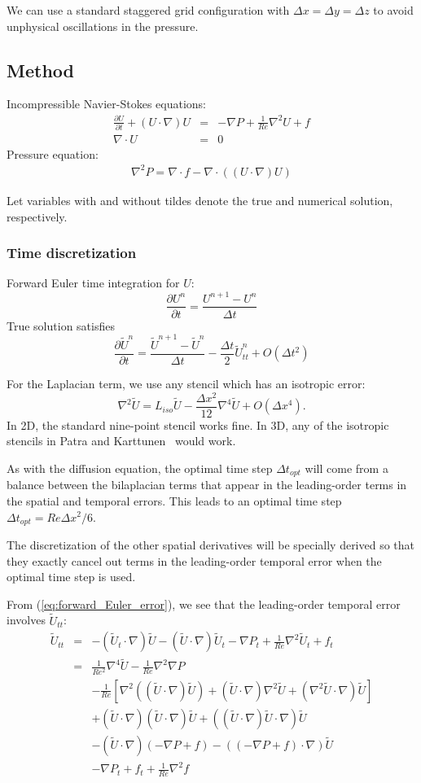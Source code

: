 \documentclass[fleqn,12pt,twoside]{article}
\newcommand{\beq}{\begin{equation}}
\newcommand{\eeq}{\end{equation}}
\newcommand{\bea}{\begin{eqnarray}}
\newcommand{\eea}{\end{eqnarray}}
\def\div{\ensuremath{\nabla \cdot}}
\def\grad{\ensuremath{\nabla}}
\def\lapl{\ensuremath{\nabla^2}}
\def\bilapl{\ensuremath{\nabla^4}}
\def\pt{\partial t}
\def\tU{\tilde{U}}
\def\dt{\Delta t}
\def\dx{\Delta x}
\def\dy{\Delta y}
\def\dz{\Delta z}
\begin{document}
We can use a standard staggered grid configuration with $\dx = \dy = \dz $ 
to avoid unphysical oscillations in the pressure.


\subsection{Method}
Incompressible Navier-Stokes equations:
\bea
  \frac{\partial U}{\pt} + \left(U \cdot \grad \right) U 
    &=& -\grad P + \frac{1}{Re} \lapl U + f
    \\
  \div U &=& 0
\eea
Pressure equation:
\bea
  \lapl P = \div f - \div \left( (U \cdot \grad) U \right)
\eea

Let variables with and without tildes denote the true and numerical solution,
respectively.


\subsubsection{Time discretization}
Forward Euler time integration for $U$:
\beq
  \frac{\partial U^n}{\pt} = \frac{U^{n+1}-U^{n}}{\dt} 
\eeq
True solution satisfies
\beq
  \frac{\partial \tU^n}{\pt} = 
    \frac{\tU^{n+1}-\tU^{n}}{\dt} - \frac{\dt}{2} \tU^n_{tt} + O(\dt^2)
  \label{eq:forward_Euler_error}
\eeq

For the Laplacian term, we use any stencil which has an isotropic error:
\beq
  \lapl \tU = L_{iso} \tU - \frac{\dx^2}{12} \bilapl \tU + O(\dx^4).
\eeq
In 2D, the standard nine-point stencil works fine.  In 3D, any of the
isotropic stencils in Patra and Karttunen~\cite{patra_2005} would work.

As with the diffusion equation, the optimal time step $\dt_{opt}$ will
come from a balance between the bilaplacian terms that appear in the 
leading-order terms in the spatial and temporal errors.  This leads to 
an optimal time step $\dt_{opt} = Re \dx^2/6$.

The discretization of the other spatial derivatives will be specially
derived so that they exactly cancel out terms in the leading-order temporal
error when the optimal time step is used.

From (\ref{eq:forward_Euler_error}), we see that the leading-order temporal
error involves $\tU_{tt}$:
\bea
  \tU_{tt} &=&
    -\left(\tU_t \cdot \grad \right) \tU 
    -\left(\tU \cdot \grad \right) \tU_t 
    -\grad P_t
    + \frac{1}{Re} \lapl \tU_t
    + f_t
    \nonumber \\
    &=& \frac{1}{Re^2} \bilapl \tU - \frac{1}{Re} \lapl \grad P  
    \nonumber \\
    & & - \frac{1}{Re} 
    \left[ \lapl \left( (\tU \cdot \grad) \tU \right)
         + \left(\tU \cdot \grad \right) \lapl \tU 
         + \left(\lapl \tU \cdot \grad \right) \tU 
    \right]
    \nonumber \\
    & & + \left(\tU \cdot \grad \right) \left(\tU \cdot \grad \right) \tU
    + \left( (\tU \cdot \grad) \tU \cdot \grad \right) \tU
    \nonumber \\
    & & - \left(\tU \cdot \grad \right) \left(-\grad P + f \right)
        - \left((-\grad P + f) \cdot \grad \right) \tU
    \nonumber \\
    & & -\grad P_t + f_t + \frac{1}{Re} \lapl f
\eea
\end{document}
